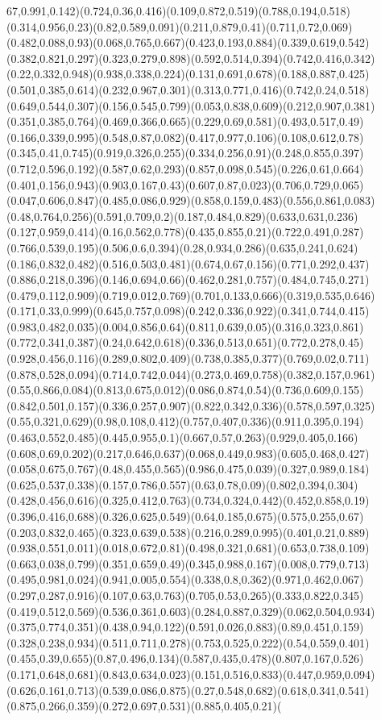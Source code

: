 {67,0.991,0.142)(0.724,0.36,0.416)(0.109,0.872,0.519)(0.788,0.194,0.518)(0.314,0.956,0.23)(0.82,0.589,0.091)(0.211,0.879,0.41)(0.711,0.72,0.069)(0.482,0.088,0.93)(0.068,0.765,0.667)(0.423,0.193,0.884)(0.339,0.619,0.542)(0.382,0.821,0.297)(0.323,0.279,0.898)(0.592,0.514,0.394)(0.742,0.416,0.342)(0.22,0.332,0.948)(0.938,0.338,0.224)(0.131,0.691,0.678)(0.188,0.887,0.425)(0.501,0.385,0.614)(0.232,0.967,0.301)(0.313,0.771,0.416)(0.742,0.24,0.518)(0.649,0.544,0.307)(0.156,0.545,0.799)(0.053,0.838,0.609)(0.212,0.907,0.381)(0.351,0.385,0.764)(0.469,0.366,0.665)(0.229,0.69,0.581)(0.493,0.517,0.49)(0.166,0.339,0.995)(0.548,0.87,0.082)(0.417,0.977,0.106)(0.108,0.612,0.78)(0.345,0.41,0.745)(0.919,0.326,0.255)(0.334,0.256,0.91)(0.248,0.855,0.397)(0.712,0.596,0.192)(0.587,0.62,0.293)(0.857,0.098,0.545)(0.226,0.61,0.664)(0.401,0.156,0.943)(0.903,0.167,0.43)(0.607,0.87,0.023)(0.706,0.729,0.065)(0.047,0.606,0.847)(0.485,0.086,0.929)(0.858,0.159,0.483)(0.556,0.861,0.083)(0.48,0.764,0.256)(0.591,0.709,0.2)(0.187,0.484,0.829)(0.633,0.631,0.236)(0.127,0.959,0.414)(0.16,0.562,0.778)(0.435,0.855,0.21)(0.722,0.491,0.287)(0.766,0.539,0.195)(0.506,0.6,0.394)(0.28,0.934,0.286)(0.635,0.241,0.624)(0.186,0.832,0.482)(0.516,0.503,0.481)(0.674,0.67,0.156)(0.771,0.292,0.437)(0.886,0.218,0.396)(0.146,0.694,0.66)(0.462,0.281,0.757)(0.484,0.745,0.271)(0.479,0.112,0.909)(0.719,0.012,0.769)(0.701,0.133,0.666)(0.319,0.535,0.646)(0.171,0.33,0.999)(0.645,0.757,0.098)(0.242,0.336,0.922)(0.341,0.744,0.415)(0.983,0.482,0.035)(0.004,0.856,0.64)(0.811,0.639,0.05)(0.316,0.323,0.861)(0.772,0.341,0.387)(0.24,0.642,0.618)(0.336,0.513,0.651)(0.772,0.278,0.45)(0.928,0.456,0.116)(0.289,0.802,0.409)(0.738,0.385,0.377)(0.769,0.02,0.711)(0.878,0.528,0.094)(0.714,0.742,0.044)(0.273,0.469,0.758)(0.382,0.157,0.961)(0.55,0.866,0.084)(0.813,0.675,0.012)(0.086,0.874,0.54)(0.736,0.609,0.155)(0.842,0.501,0.157)(0.336,0.257,0.907)(0.822,0.342,0.336)(0.578,0.597,0.325)(0.55,0.321,0.629)(0.98,0.108,0.412)(0.757,0.407,0.336)(0.911,0.395,0.194)(0.463,0.552,0.485)(0.445,0.955,0.1)(0.667,0.57,0.263)(0.929,0.405,0.166)(0.608,0.69,0.202)(0.217,0.646,0.637)(0.068,0.449,0.983)(0.605,0.468,0.427)(0.058,0.675,0.767)(0.48,0.455,0.565)(0.986,0.475,0.039)(0.327,0.989,0.184)(0.625,0.537,0.338)(0.157,0.786,0.557)(0.63,0.78,0.09)(0.802,0.394,0.304)(0.428,0.456,0.616)(0.325,0.412,0.763)(0.734,0.324,0.442)(0.452,0.858,0.19)(0.396,0.416,0.688)(0.326,0.625,0.549)(0.64,0.185,0.675)(0.575,0.255,0.67)(0.203,0.832,0.465)(0.323,0.639,0.538)(0.216,0.289,0.995)(0.401,0.21,0.889)(0.938,0.551,0.011)(0.018,0.672,0.81)(0.498,0.321,0.681)(0.653,0.738,0.109)(0.663,0.038,0.799)(0.351,0.659,0.49)(0.345,0.988,0.167)(0.008,0.779,0.713)(0.495,0.981,0.024)(0.941,0.005,0.554)(0.338,0.8,0.362)(0.971,0.462,0.067)(0.297,0.287,0.916)(0.107,0.63,0.763)(0.705,0.53,0.265)(0.333,0.822,0.345)(0.419,0.512,0.569)(0.536,0.361,0.603)(0.284,0.887,0.329)(0.062,0.504,0.934)(0.375,0.774,0.351)(0.438,0.94,0.122)(0.591,0.026,0.883)(0.89,0.451,0.159)(0.328,0.238,0.934)(0.511,0.711,0.278)(0.753,0.525,0.222)(0.54,0.559,0.401)(0.455,0.39,0.655)(0.87,0.496,0.134)(0.587,0.435,0.478)(0.807,0.167,0.526)(0.171,0.648,0.681)(0.843,0.634,0.023)(0.151,0.516,0.833)(0.447,0.959,0.094)(0.626,0.161,0.713)(0.539,0.086,0.875)(0.27,0.548,0.682)(0.618,0.341,0.541)(0.875,0.266,0.359)(0.272,0.697,0.531)(0.885,0.405,0.21)(}
